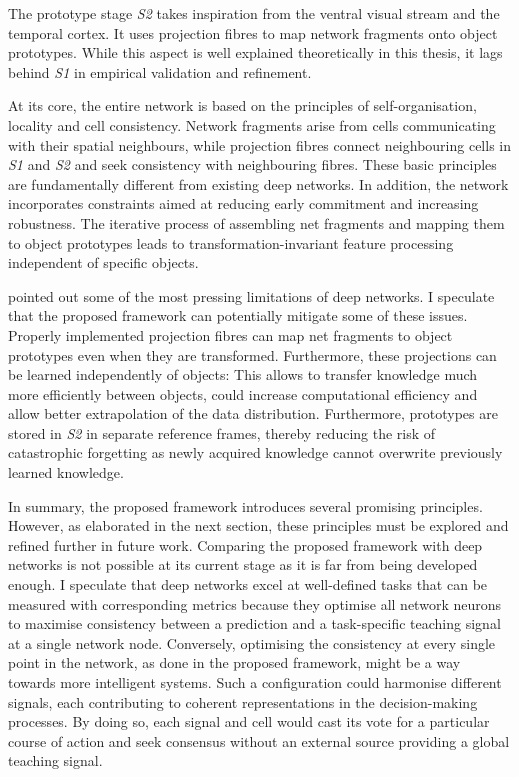 The prototype stage \emph{S2} takes inspiration from the ventral visual stream and the temporal cortex.
It uses projection fibres to map network fragments onto object prototypes. While this aspect is well explained theoretically in this thesis, it lags behind \emph{S1} in empirical validation and refinement.

At its core, the entire network is based on the principles of self-organisation, locality and cell consistency.
Network fragments arise from cells communicating with their spatial neighbours, while projection fibres connect neighbouring cells in \emph{S1} and \emph{S2} and seek consistency with neighbouring fibres.
These basic principles are fundamentally different from existing deep networks. In addition, the network incorporates constraints aimed at reducing early commitment and increasing robustness. The iterative process of assembling net fragments and mapping them to object prototypes leads to transformation-invariant feature processing independent of specific objects.

 pointed out some of the most pressing limitations of deep networks.
I speculate that the proposed framework can potentially mitigate some of these issues. Properly implemented projection fibres can map net fragments to object prototypes even when they are transformed. Furthermore, these projections can be learned independently of objects: This allows to transfer knowledge much more efficiently between objects, could increase computational efficiency and allow better extrapolation of the data distribution. Furthermore, prototypes are stored in \emph{S2} in separate reference frames, thereby reducing the risk of catastrophic forgetting as newly acquired knowledge cannot overwrite previously learned knowledge.


In summary, the proposed framework introduces several promising principles. However, as elaborated in the next section, these principles must be explored and refined further in future work.
Comparing the proposed framework with deep networks is not possible at its current stage as it is far from being developed enough. 
I speculate that deep networks excel at well-defined tasks that can be measured with corresponding metrics because they optimise all network neurons to maximise consistency between a prediction and a task-specific teaching signal at a single network node. Conversely, optimising the consistency at every single point in the network, as done in the proposed framework, might be a way towards more intelligent systems. Such a configuration could harmonise different signals, each contributing to coherent representations in the decision-making processes. By doing so, each signal and cell would cast its vote for a particular course of action and seek consensus without an external source providing a global teaching signal.


